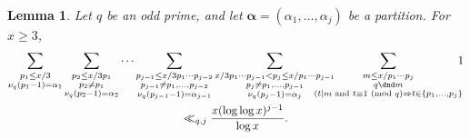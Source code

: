 \documentclass[12pt,reqno]{amsart}
\newtheorem{lemma}[theorem]{Lemma}
\theoremstyle{definition}
\newcommand{\balpha}{{\bm\alpha}}
\renewcommand{\mod}[1]{{\ifmmode\text{\rm\ (mod~$#1$)}\else\discretionary{}{}{\hbox{ }}\rm(mod~$#1$)\fi}}
\begin{document}
\begin{lemma}\label{secondsum}
Let $q$ be an odd prime, and let $\balpha=(\alpha_1,\dots,\alpha_j)$ be a partition. For $x\ge3$,
\begin{multline*}
\sum_{\substack{p_1\le x/3 \\ \nu_q(p_1-1)=\alpha_1}}\sum_{\substack{p_2\le x/3p_1\\p_2\ne p_1\\\nu_q(p_2-1)=\alpha_2}}\cdots \sum_{\substack{p_{j-1}\le x/3p_1\cdots p_{j-2} \\ p_{j-1}\ne p_1,\ldots,p_{j-2} \\ \nu_q(p_{j-1}-1)=\alpha_{j-1}}} \sum_{\substack{x/3p_1\cdots p_{j-1}<p_j\le x/p_1\cdots p_{j-1}\\p_j\ne p_1,\ldots,p_{j-1}\\\nu_q(p_j-1)=\alpha_j}} \hskip-7mm \sum_{\substack{m\le x/p_1\cdots p_j\\q\dnd m\\ (t\mid m\text{ and }t\equiv1\mod q \Rightarrow t\in\{p_1,\dots,p_j\}}} \hskip-2mm 1 \\
\ll_{q,j} \frac{x(\log\log x)^{j-1}}{\log x}.
\end{multline*}
\end{lemma}
\end{document}
